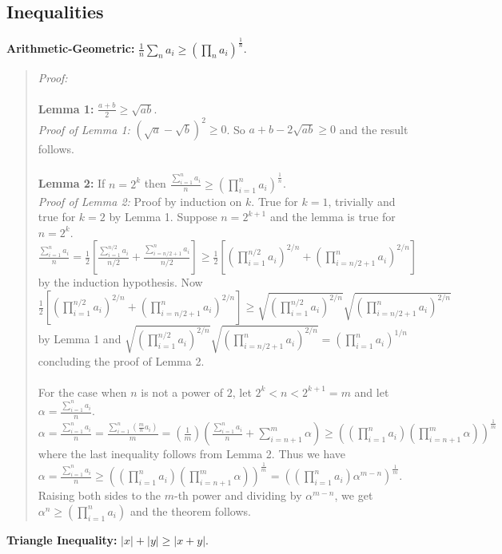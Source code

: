 \subsection{Inequalities}
{\bf Arithmetic-Geometric:}
${\frac {1} {n}} {\sum_n {a_i}} \geq (\prod_n {a_i})^{\frac 1 n}$.
\begin{quote}
\emph{Proof:}
\\
\\
{\bf Lemma 1:} ${\frac {a+b} 2} \geq {\sqrt {ab}}$.
\\
\emph{Proof of Lemma 1:} $({\sqrt a} - {\sqrt b})^2 \geq 0$.  
So $a + b - 2{\sqrt {ab}} \geq 0$ and the result follows.
\\
\\
{\bf Lemma 2:} If $n= 2^k$ then 
${\frac {\sum_{i=1}^{n} a_i} n}  \geq (\prod_{i=1}^{n} a_i)^{\frac 1 n}$.
\\
\emph{Proof of Lemma  2:} Proof by induction on $k$.  True for $k=1$, trivially and
true for $k=2$ by Lemma 1.  Suppose $n= 2^{k+1}$ and the lemma is true for $n= 2^k$.
$ {\frac {\sum_{i=1}^{n} a_i} n}=
{\frac 1 2}  [ {\frac {\sum_{i=1}^{n/2} a_i } {n/2}} + {\frac {\sum_{i=n/2+1}^{n} a_i } {n/2}} ]
\geq {\frac 1 2} 
[(\prod_{i=1}^{n/2} a_i)^{2/n} + (\prod_{i=n/2+1}^{n} a_i)^{2/n} ]$ by the induction hypothesis. 
Now $ {\frac 1 2} [ (\prod_{i=1}^{n/2} a_i)^{2/n} + (\prod_{i=n/2+1}^{n} a_i)^{2/n} ]
\geq {\sqrt {(\prod_{i=1}^{n/2} a_i)^{2/n}}} {\sqrt {(\prod_{i=n/2+1}^{n} a_i)^{2/n}}}$
by Lemma 1 and ${\sqrt {(\prod_{i=1}^{n/2} a_i)^{2/n}}} {\sqrt {(\prod_{i=n/2+1}^{n} a_i)^{2/n}}}=
(\prod_{i=1}^{n} a_i)^{1/n}$ concluding the proof of Lemma 2.
\\
\\
For the case when $n$ is not a power of $2$, let $2^k < n < 2^{k+1}= m$ and
let $ \alpha = {\frac {\sum_{i=1}^{n} a_i} n}$.
$ \alpha = {\frac {\sum_{i=1}^{n} a_i} n}  =
{\frac {\sum_{i=1}^{n} ({\frac m n} a_i)} {m}} =
({\frac 1 m}) ({\frac {\sum_{i=1}^{n} a_i} {n}} +
{\sum_{i=n+1}^{m} } \alpha) \geq
((\prod_{i=1}^{n} a_i) (\prod_{i=n+1}^{m} \alpha))^{\frac 1 m} $ where the last inequality follows from
Lemma 2.  Thus we have
$\alpha = {\frac {\sum_{i=1}^{n} a_i} n}  \geq
((\prod_{i=1}^{n} a_i) (\prod_{i=n+1}^{m} \alpha))^{\frac 1 m} =
((\prod_{i=1}^{n} a_i) \alpha^{m-n})^{\frac 1 m} $.  Raising both sides to the $m$-th power and
dividing by $\alpha^{m-n}$, we get
$\alpha^n \geq (\prod_{i=1}^{n} a_i)$ and the theorem follows.
\end{quote}
{\bf Triangle Inequality:} $|x|+|y| \geq |x+y|$.
\\
